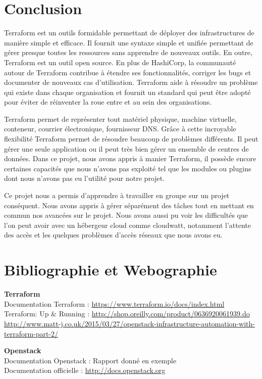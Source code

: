 \documentclass[]{article}
\begin{document}
\newpage
\section{Conclusion}\label{conclusion}

Terraform est un outils formidable permettant de déployer des
infrastructures de manière simple et efficace. Il fournit une syntaxe
simple et unifiée permettant de gérer presque toutes les ressources sans
apprendre de nouveaux outils. En outre, Terraform est un outil open
source. En plus de HashiCorp, la communauté autour de Terraform
contribue à étendre ses fonctionnalités, corriger les bugs et documenter
de nouveaux cas d'utilisation. Terraform aide à résoudre un problème qui
existe dans chaque organisation et fournit un standard qui peut être
adopté pour éviter de réinventer la roue entre et au sein des
organisations.

Terraform permet de représenter tout matériel physique, machine virtuelle, conteneur, courrier électronique, fournisseur DNS. Grâce à cette incroyable flexibilité Terraform permet de résoudre beaucoup de problèmes différents. Il peut gérer une seule application ou il peut très bien gérer un ensemble de centres de données. Dans ce projet, nous avons appris à manier Terraform, il possède encore certaines capacités que nous n'avons pas exploité tel que les modules ou plugins dont nous n'avons pas eu l'utilité pour notre projet.

Ce projet nous a permis d'apprendre à travailler en groupe sur un projet conséquent. Nous avons appris à gérer séparément des tâches tout en mettant en commun nos avancées sur le projet. Nous avons aussi pu voir les difficultés que l'on peut avoir avec un hébergeur cloud comme cloudwatt, notamment l'attente des accès et les quelques problèmes d'accès réseaux que nous avons eu.

\newpage
\section*{Bibliographie et Webographie}
\textbf{Terraform}\\
Documentation Terraform : \url{https://www.terraform.io/docs/index.html} \\
Terraform: Up \& Running : \url{http://shop.oreilly.com/product/0636920061939.do } \\
\url{http://www.matt-j.co.uk/2015/03/27/openstack-infrastructure-automation-with-terraform-part-2/}

\textbf{Openstack}\\
Documentation Openstack : Rapport donné en exemple \\
Documentation officielle : \url{http://docs.openstack.org}
\end{document}

